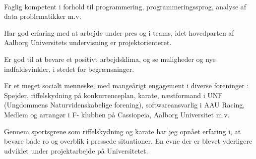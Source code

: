 \\
Faglig kompetent i forhold til programmering, programmeringssprog, analyse af data problematikker m.v.

Har god erfaring med at arbejde under pres og i teams, idet hovedparten af Aalborg Universitets undervisning er projektorienteret.

Er god til at bevare et positivt arbejdsklima, og se muligheder og nye indfaldsvinkler, i stedet for begrænsninger.

Er et meget socialt menneske, med mangeårigt engagement i diverse foreninger : Spejder, riffelskydning på konkurrenceplan, karate, næstformand i UNF (Ungdommens Naturvidenskabelige forening), softwareansvarlig i AAU Racing, Medlem og arrangør i F- klubben på Cassiopeia, Aalborg Universitet m.v.

Gennem sportsgrene som riffelskydning og karate har jeg opnået erfaring i, at bevare både ro og overblik i pressede situationer. En evne der er blevet yderligere udviklet under projektarbejde på Universitetet.
